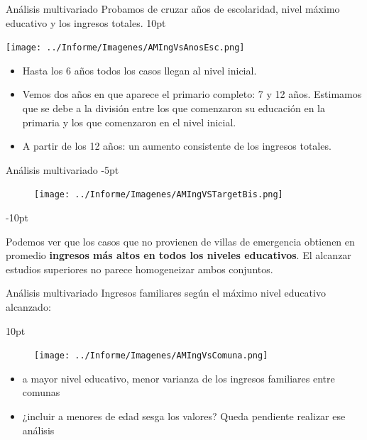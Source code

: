 \documentclass[pdf]{beamer}
\def\vspace{}%
\begin{document}
{\begin{frame}{Análisis multivariado}
    \footnotesize
    Probamos de cruzar años de escolaridad, nivel máximo educativo y los ingresos totales.
    \vspace{10pt}
    \begin{minipage}{0.5\textwidth}
        \texttt{[image: ../Informe/Imagenes/AMIngVsAnosEsc.png]}
    \end{minipage}
\begin{minipage}{0.45\textwidth}
    \begin{itemize}
        \footnotesize
        \justifying%
        \item Hasta los 6 años todos los casos llegan al nivel inicial.
        \item Vemos dos años en que aparece el primario completo: 7 y 12 años. Estimamos que se debe a la división entre los que comenzaron su educación en la primaria y los que comenzaron en el nivel inicial.
        \item A partir de los 12 años: un aumento consistente de los ingresos totales.
    \end{itemize}
\end{minipage}
\end{frame} 
\begin{frame}{Análisis multivariado}
    \vspace{-5pt}
    \begin{figure}[H]
        \texttt{[image: ../Informe/Imagenes/AMIngVSTargetBis.png]}
    \end{figure}
    \vspace{-10pt}
    
    
    Podemos ver que los casos que no provienen de villas de emergencia obtienen en promedio \textbf{ingresos más altos en todos los niveles educativos}. El alcanzar estudios superiores no parece homogeneizar ambos conjuntos. 
\end{frame}

\begin{frame}{Análisis multivariado}
    Ingresos familiares según el máximo nivel educativo alcanzado:

    \begin{minipage}{0.55\textwidth}
        \vspace{10pt}
        \begin{figure} 
        \texttt{[image: ../Informe/Imagenes/AMIngVsComuna.png]}
        \end{figure}
    \end{minipage}
    \begin{minipage}{0.38\textwidth}
        \begin{itemize}
            \justifying%
            \item a mayor nivel educativo, menor varianza de los ingresos familiares entre comunas
            \item ¿incluir a menores de edad sesga los valores? Queda pendiente realizar ese análisis
        \end{itemize}
    \end{minipage}


\end{frame}}
\end{document}

